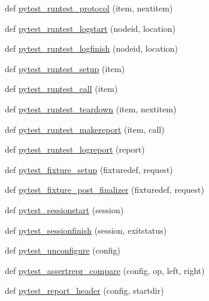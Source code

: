 \begin{DoxyCompactItemize}
def \hyperlink{namespace__pytest_1_1hookspec_ac4f82157222aa0ffa3d12e214deafdff}{pytest\+\_\+runtest\+\_\+protocol} (item, nextitem)
\item 
def \hyperlink{namespace__pytest_1_1hookspec_a5b76875e80ea668bb17d1bd097393e27}{pytest\+\_\+runtest\+\_\+logstart} (nodeid, location)
\item 
def \hyperlink{namespace__pytest_1_1hookspec_af0925a9799718b69aa8135ccbf500b08}{pytest\+\_\+runtest\+\_\+logfinish} (nodeid, location)
\item 
def \hyperlink{namespace__pytest_1_1hookspec_a29020e1331bc418fab32ef119c805d49}{pytest\+\_\+runtest\+\_\+setup} (item)
\item 
def \hyperlink{namespace__pytest_1_1hookspec_aa09a2fd2733026468a618d65d1594415}{pytest\+\_\+runtest\+\_\+call} (item)
\item 
def \hyperlink{namespace__pytest_1_1hookspec_aa72d91f2d5e025256584f91d01de408c}{pytest\+\_\+runtest\+\_\+teardown} (item, nextitem)
\item 
def \hyperlink{namespace__pytest_1_1hookspec_a9062f435f95835f3cbd0b5fba2f457a2}{pytest\+\_\+runtest\+\_\+makereport} (item, call)
\item 
def \hyperlink{namespace__pytest_1_1hookspec_a193ef20b875638293433e92c8debd190}{pytest\+\_\+runtest\+\_\+logreport} (report)
\item 
def \hyperlink{namespace__pytest_1_1hookspec_a55f8324bbd5d1d8d0bc99275e255a487}{pytest\+\_\+fixture\+\_\+setup} (fixturedef, request)
\item 
def \hyperlink{namespace__pytest_1_1hookspec_a9ae34ba449799bf389f5bd44f53af41b}{pytest\+\_\+fixture\+\_\+post\+\_\+finalizer} (fixturedef, request)
\item 
def \hyperlink{namespace__pytest_1_1hookspec_ac68a946f4ca687e1cfd573fdd6517935}{pytest\+\_\+sessionstart} (session)
\item 
def \hyperlink{namespace__pytest_1_1hookspec_af6e62afd7bc335947df1509e0e06b90a}{pytest\+\_\+sessionfinish} (session, exitstatus)
\item 
def \hyperlink{namespace__pytest_1_1hookspec_a1bd77a9e730339f8a281abfe18df613d}{pytest\+\_\+unconfigure} (config)
\item 
def \hyperlink{namespace__pytest_1_1hookspec_a447d47cdf30370db1a54107f2979ccba}{pytest\+\_\+assertrepr\+\_\+compare} (config, op, left, right)
\item 
def \hyperlink{namespace__pytest_1_1hookspec_ad17018fc890c9706c68153433a575710}{pytest\+\_\+report\+\_\+header} (config, startdir)
\item 

\end{DoxyCompactItemize}

